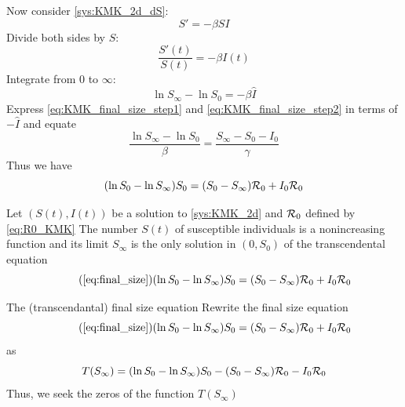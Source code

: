 \documentclass[aspectratio=169]{beamer}\usepackage[]{graphicx}\usepackage[]{xcolor}
\begin{document}
\begin{frame}{}
  Now consider \eqref{sys:KMK_2d_dS}:
  $$
  S' = -\beta SI
  $$
  Divide both sides by $S$:
  $$
  \frac{S'(t)}{S(t)} = -\beta I(t)
  $$
  Integrate from 0 to $\infty$:
  \begin{equation}
  \label{eq:KMK_final_size_step2}
  \ln S_\infty-\ln S_0 = -\beta \hat I
  \end{equation}
  Express \eqref{eq:KMK_final_size_step1} and \eqref{eq:KMK_final_size_step2} in terms of $-\hat I$ and equate
  $$
  \frac{\ln S_\infty-\ln S_0}{\beta}
  =
  \frac{S_\infty-S_0-I_0}{\gamma}
  $$
  Thus we have
  \begin{equation}
  \label{eq:final_size}
  (\ln S_0-\ln S_\infty)S_0 = (S_0-S_\infty)\mathcal{R}_0+I_0\mathcal{R}_0
  \end{equation}
\end{frame}



\begin{frame}{}
\begin{theorem}
  Let $(S(t),I(t))$ be a solution to \eqref{sys:KMK_2d} and $\mathcal{R}_0$ defined by \eqref{eq:R0_KMK}
  \vskip0.5cm
  The number $S(t)$ of susceptible individuals is a nonincreasing function and its limit $S_\infty$ is the only solution in $(0,S_0)$ of the transcendental equation
  \begin{equation}\tag{\ref{eq:final_size}}
  (\ln S_0-\ln S_\infty)S_0 = (S_0-S_\infty)\R_0+I_0\R_0
  \end{equation}
\end{theorem}
\end{frame}



\begin{frame}{The (transcendantal) final size equation}
  Rewrite the final size equation
  \begin{equation}
    \tag{\ref{eq:final_size}}
  (\ln S_0-\ln S_\infty)S_0 = (S_0-S_\infty)\R_0+I_0\R_0
  \end{equation}
  as
  \begin{equation}
  \label{eq:final_size_2}
  T(S_\infty) =(\ln S_0-\ln S_\infty)S_0
  - (S_0-S_\infty)\mathcal{R}_0 -I_0\mathcal{R}_0
\end{equation}
\vfill
Thus, we seek the zeros of the function $T(S_\infty)$
\end{frame}
\end{document}
